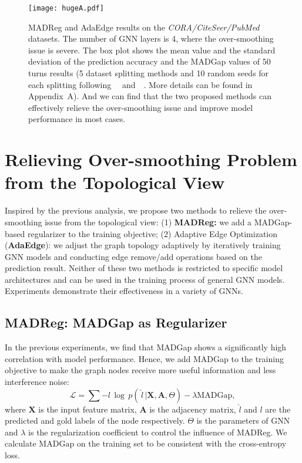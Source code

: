 \documentclass[letterpaper]{article} \usepackage{aaai20}  \usepackage{times}  \usepackage{helvet} \usepackage{courier}  \usepackage[hyphens]{url}  \usepackage{graphicx} \urlstyle{rm} \def\UrlFont{\rm}  \frenchspacing  \setlength{\pdfpagewidth}{8.5in}  \setlength{\pdfpageheight}{11in}  \setcounter{secnumdepth}{0}
\newcommand{\citet}[1]{\citeauthor{#1}~\shortcite{#1}}
\begin{document}
\begin{figure*}[t]
\centering
\texttt{[image: hugeA.pdf]}
\caption{MADReg and AdaEdge results on the \textit{CORA/CiteSeer/PubMed} datasets. The number of GNN layers is 4, where the over-smoothing issue is severe. The box plot shows the mean value and the standard deviation of the prediction accuracy and the MADGap values of 50 turns results (5 dataset splitting methods and 10 random seeds for each splitting following~\citet{dataset_amazon} and~\citet{method_fishergcn}. More details can be found in Appendix~A). And we can find that the two proposed methods can effectively relieve the over-smoothing issue and improve model performance in most cases.}
\label{figure_box}
\end{figure*}


\section{Relieving Over-smoothing Problem from the Topological View}
Inspired by the previous analysis, we propose two methods to relieve the over-smoothing issue from the topological view: 
(1) \textbf{MADReg:} we add a MADGap-based regularizer to the training objective; 
(2) Adaptive Edge Optimization (\textbf{AdaEdge}): we adjust the graph topology adaptively by iteratively training GNN models and conducting edge remove/add operations based on the prediction result.
Neither of these two methods is restricted to specific model architectures and can be used in the training process of general GNN models. Experiments demonstrate their effectiveness in a variety of GNNs. 


\subsection{MADReg: MADGap as Regularizer}
In the previous experiments, we find that MADGap shows a significantly high correlation with model performance. 
Hence, we add MADGap to the training objective to make the graph nodes receive more useful information and less interference noise:
\begin{equation}
\mathcal{L} = \sum -l\,\log\,p(\,\hat{l}\,|\bm{X},\bm{A},\Theta) - \lambda\mathrm{MADGap},
\end{equation}
where $\bm{X}$ is the input feature matrix, $\bm{A}$ is the adjacency matrix, $\hat{l}$ and $l$ are the predicted and gold labels of the node respectively. $\Theta$ is the parameters of GNN and $\lambda$ is the regularization coefficient to control the influence of MADReg. 
We calculate $\mathrm{MADGap}$ on the training set to be consistent with the cross-entropy loss.
\end{document}
